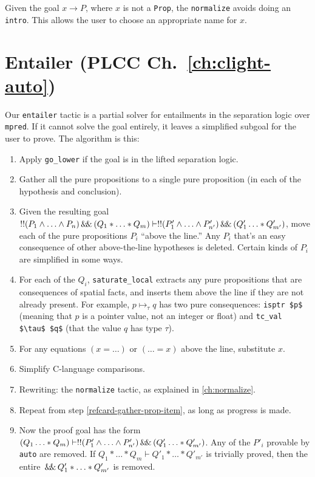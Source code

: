 \documentclass[12pt,fleqn,openany,oneside,showtrims]{memoir}
\newcommand{\ychapter}[2]{\chapter[#1]{#1 \hfill \normalsize #2}}
\begin{document}
Given the goal $x \rightarrow P$, where $x$ is not
a \lstinline{Prop}, the \lstinline{normalize} avoids
doing an \lstinline{intro}.  This allows the user
to choose an appropriate name for $x$.

\ychapter{Entailer}{(PLCC Ch.~\ref{ch:clight-auto})}
\label{refcard:entailer}
Our \lstinline{entailer} tactic is a partial solver
for entailments in the separation logic over \lstinline{mpred}.
If it cannot solve the goal entirely, it leaves a simplified
subgoal for the user to prove.  The algorithm is this:
\begin{enumerate}
\item Apply \lstinline{go_lower} if the goal is in the lifted
separation logic.
\item Gather all the pure propositions to a single pure proposition
\label{refcard-gather-prop-item}
(in each of the hypothesis and conclusion).
\item Given the resulting goal $!! (P_1 \wedge \ldots \wedge P_n) \,\mathsf{\&\hspace{-.2em}\&}\, (Q_1*\ldots*Q_m) \vdash !! (P'_1 \wedge \ldots \wedge P'_{n'}) \,\mathsf{\&\hspace{-.2em}\&}\, (Q'_1\ldots*Q'_{m'})$, 
move each of the pure propositions $P_i$ ``above the line.''  Any $P_i$ that's
an easy consequence of other above-the-line hypotheses is deleted.
Certain kinds of $P_i$ are simplified in some ways.
\item For each of the $Q_i$, \lstinline{saturate_local} extracts any
pure propositions that are consequences of spatial facts, and inserts
them above the line if they  are not already present.  For example,
$p \mapsto_\tau q$ has two pure consequences: \lstinline{isptr $p$}
(meaning that $p$ is a pointer value, not an integer or float)
and \lstinline{tc_val $\tau$ $q$} (that the value $q$ has type $\tau$).
\item For any equations $(x=\ldots)$ or $(\ldots=x)$ above the line,
substitute $x$.
\item Simplify C-language comparisons.
\item Rewriting: the \lstinline{normalize}
tactic, as explained in \autoref{ch:normalize}.
\item Repeat from step \ref{refcard-gather-prop-item}, as long as progress is made.
\item Now the proof goal has the form
$(Q_1\ldots*Q_m) \vdash !! (P'_1 \wedge \ldots \wedge P'_{n'}) \,\mathsf{\&\hspace{-.2em}\&}\, (Q'_1\ldots*Q'_{m'})$.
Any of the $P'_i$ provable by \lstinline{auto} are removed.
If $Q_1*\ldots*Q_m \vdash Q'_1*\ldots*Q'_{m'}$ is trivially
proved, then the entire $\,\mathsf{\&\hspace{-.2em}\&}\, Q'_1*\ldots*Q'_{m'}$ is removed.
\end{enumerate}
\end{document}
